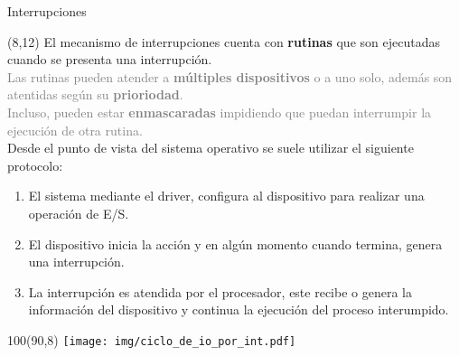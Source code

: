 \documentclass[aspectratio=169]{beamer}
\begin{document}
\begin{frame}{Interrupciones}
    \begin{textblock}{78}(8,12)
    \small
    El mecanismo de interrupciones cuenta con \textbf{rutinas} que son ejecutadas cuando se presenta una interrupción.\\
    \medskip
    \textcolor{gray}{Las rutinas pueden atender a \textbf{múltiples dispositivos} o a uno solo, además son atentidas según su \textbf{prioriodad}.\\
    Incluso, pueden estar \textbf{enmascaradas} impidiendo que puedan interrumpir la ejecución de otra rutina.\\}
    \medskip
    Desde el punto de vista del sistema operativo se suele utilizar el siguiente protocolo:\\
    \medskip
    \footnotesize
    \begin{enumerate}
    \item El sistema mediante el driver, configura al dispositivo para realizar una operación de E/S.
    \item El dispositivo inicia la acción y en algún momento cuando termina, genera una interrupción.
    \item La interrupción es atendida por el procesador, este recibe o genera la información del dispositivo y continua la ejecución del proceso interumpido.
    \end{enumerate}    
    \end{textblock}
    \begin{textblock}{100}(90,8)
    \texttt{[image: img/ciclo\_de\_io\_por\_int.pdf]}
    \end{textblock}
\end{frame}
\end{document}
